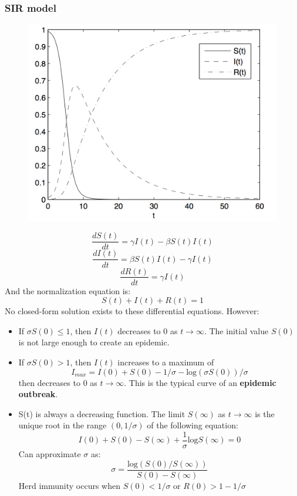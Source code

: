 \documentclass{article}
\begin{document}
\subsubsection{SIR model}

\begin{figure}
\includegraphics[width=\linewidth]{SIR.png}
\end{figure}

$$\frac{dS(t)}{dt} = \gamma I(t) - \beta S(t) I(t) $$
$$ \frac{dI(t)}{dt} = \beta S(t) I(t) - \gamma I(t) $$
$$ \frac{dR(t)}{dt} = \gamma I(t) $$
And the normalization equation is:
$$ S(t) + I(t) + R(t) = 1 $$
No closed-form solution exists to these differential equations. However:
\begin{itemize}
\item If $\sigma S(0) \leq 1$, then $I(t)$ decreases to 0 as $t \to \infty$. The initial value $S(0)$ is not large enough to create an epidemic.
\item If $\sigma S(0) > 1$, then $I(t)$ increases to a maximum of
$$I_{max} = I(0) + S(0) - 1/\sigma - \text{log}(\sigma S(0))/\sigma$$
then decreases to 0 as $t \to \infty$. This is the typical curve of an \textbf{epidemic outbreak}.
\item S(t) is always a decreasing function. The limit $S(\infty)$ as $t \to \infty$ is the unique
root in the range $(0, 1/\sigma)$ of the following equation: 
$$I(0)+S(0)−S(\infty)+ \frac{1}{\sigma} \text{log} S(\infty) =0$$
Can approximate $\sigma$ as:
$$ \sigma = \frac{\text{log}(S(0)/S(\infty))}{S(0)-S(\infty)} $$
Herd immunity occurs when $S(0) < 1/\sigma$ or $R(0) > 1 - 1/\sigma$
\end{itemize}
\end{document}
